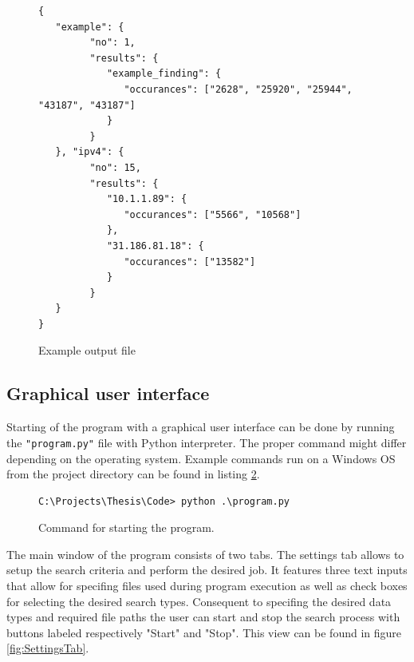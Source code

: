 \documentclass[a4paper,twoside,12pt]{book}
\begin{document}
\begin{figure}
\centering
\begin{lstlisting}
{
   "example": {
         "no": 1, 
         "results": {
            "example_finding": {
               "occurances": ["2628", "25920", "25944", "43187", "43187"]
            }
         }   
   }, "ipv4": {
         "no": 15, 
         "results": {
            "10.1.1.89": {
               "occurances": ["5566", "10568"]
            }, 
            "31.186.81.18": {
               "occurances": ["13582"]
            }
         }
   }
}
\end{lstlisting}
\caption{Example output file}
\label{fig:outputFile}
\end{figure}

\subsection{Graphical user interface}

Starting of the program with a graphical user interface can be done by running the \lstinline|"program.py"| file with Python interpreter. The proper command
might differ depending on the operating system. Example commands run on a Windows OS from the project directory
can be found in listing \ref{fig:startCommand}.

\begin{figure}
\centering
\begin{lstlisting}
C:\Projects\Thesis\Code> python .\program.py
\end{lstlisting}
\caption{Command for starting the program.}
\label{fig:startCommand}
\end{figure}

The main window of the program consists of two tabs. The settings tab allows to setup the search criteria and perform
the desired job. It features three text inputs that allow for specifing files used during program execution as well as 
check boxes for selecting the desired search types. Consequent to specifing the desired data types and required file paths the user can start and stop the search process
with buttons labeled respectively "Start" and "Stop". This view can be found in figure \ref{fig:SettingsTab}.
\end{document}
